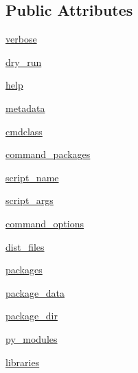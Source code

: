 \subsection*{Public Attributes}
\begin{DoxyCompactItemize}
\item 
\hyperlink{classsetuptools_1_1__distutils_1_1dist_1_1Distribution_abfa99c501c4b28356e843f9ed532acf4}{verbose}
\item 
\hyperlink{classsetuptools_1_1__distutils_1_1dist_1_1Distribution_a4fd425a30127ce6ef39396a24c948c7b}{dry\+\_\+run}
\item 
\hyperlink{classsetuptools_1_1__distutils_1_1dist_1_1Distribution_a3095441fb4ba1838af5132f8ce7c115c}{help}
\item 
\hyperlink{classsetuptools_1_1__distutils_1_1dist_1_1Distribution_a4d59f2cdf7d4c6add60c1f251074b6a1}{metadata}
\item 
\hyperlink{classsetuptools_1_1__distutils_1_1dist_1_1Distribution_a0f26daff25283b455920efb4671fae48}{cmdclass}
\item 
\hyperlink{classsetuptools_1_1__distutils_1_1dist_1_1Distribution_aef26e61a0c0446f4e83e289be3faae88}{command\+\_\+packages}
\item 
\hyperlink{classsetuptools_1_1__distutils_1_1dist_1_1Distribution_aba9a4454131bf40af16d3b5cf02b8426}{script\+\_\+name}
\item 
\hyperlink{classsetuptools_1_1__distutils_1_1dist_1_1Distribution_a14986075c436784d3a6d820a50b21066}{script\+\_\+args}
\item 
\hyperlink{classsetuptools_1_1__distutils_1_1dist_1_1Distribution_a4601e1e42460d7a436c35cc731cf2627}{command\+\_\+options}
\item 
\hyperlink{classsetuptools_1_1__distutils_1_1dist_1_1Distribution_a97a334d28506cf383b2a40ac93070557}{dist\+\_\+files}
\item 
\hyperlink{classsetuptools_1_1__distutils_1_1dist_1_1Distribution_ad39141aa58d23bc2b34caaf777b1f644}{packages}
\item 
\hyperlink{classsetuptools_1_1__distutils_1_1dist_1_1Distribution_ae0c8ef6a6983535e6df0ba6f3f3ef6b7}{package\+\_\+data}
\item 
\hyperlink{classsetuptools_1_1__distutils_1_1dist_1_1Distribution_a978e573b0ac9e08e9f37636af25c5238}{package\+\_\+dir}
\item 
\hyperlink{classsetuptools_1_1__distutils_1_1dist_1_1Distribution_a68c59485bc97dccf0dae1ea67ba22cc1}{py\+\_\+modules}
\item 
\hyperlink{classsetuptools_1_1__distutils_1_1dist_1_1Distribution_ab88b6e9288f08576903310eb668db681}{libraries}

\end{DoxyCompactItemize}
